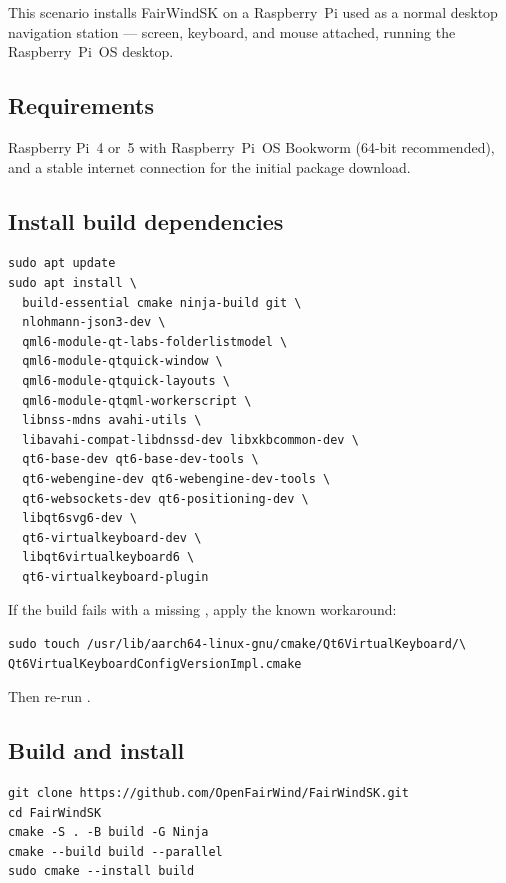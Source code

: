 This scenario installs FairWindSK on a Raspberry~Pi used as a normal
desktop navigation station --- screen, keyboard, and mouse attached,
running the Raspberry~Pi~OS desktop.

\subsection{Requirements}

Raspberry Pi~4 or~5 with Raspberry~Pi~OS Bookworm (64-bit recommended),
and a stable internet connection for the initial package download.

\subsection{Install build dependencies}

\begin{lstlisting}
sudo apt update
sudo apt install \
  build-essential cmake ninja-build git \
  nlohmann-json3-dev \
  qml6-module-qt-labs-folderlistmodel \
  qml6-module-qtquick-window \
  qml6-module-qtquick-layouts \
  qml6-module-qtqml-workerscript \
  libnss-mdns avahi-utils \
  libavahi-compat-libdnssd-dev libxkbcommon-dev \
  qt6-base-dev qt6-base-dev-tools \
  qt6-webengine-dev qt6-webengine-dev-tools \
  qt6-websockets-dev qt6-positioning-dev \
  libqt6svg6-dev \
  qt6-virtualkeyboard-dev \
  libqt6virtualkeyboard6 \
  qt6-virtualkeyboard-plugin
\end{lstlisting}

\begin{notebox}
If the build fails with a missing
, apply the known
workaround:
\begin{lstlisting}
sudo touch /usr/lib/aarch64-linux-gnu/cmake/Qt6VirtualKeyboard/\
Qt6VirtualKeyboardConfigVersionImpl.cmake
\end{lstlisting}
Then re-run \code{cmake}.
\end{notebox}

\subsection{Build and install}

\begin{lstlisting}
git clone https://github.com/OpenFairWind/FairWindSK.git
cd FairWindSK
cmake -S . -B build -G Ninja
cmake --build build --parallel
sudo cmake --install build
\end{lstlisting}

